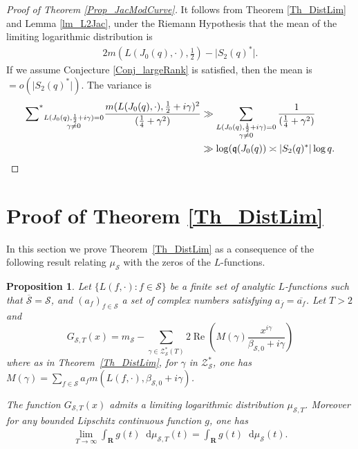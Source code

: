 \documentclass[a4paper,10pt]{amsart}
\theoremstyle{plain}
\newtheorem{prop}[theo]{Proposition}
\theoremstyle{definition}
\begin{document}
\begin{proof}[Proof of Theorem \ref{Prop_JacModCurve}]
It follows from Theorem \ref{Th_DistLim} and Lemma \ref{lm_L2Jac}, under the Riemann Hypothesis that
the mean of the limiting logarithmic distribution is
\begin{align*}
2m\left(L(J_{0}(q),\cdot),\frac{1}{2}\right) - \lvert S_{2}(q)^{*} \rvert.
\end{align*}
If we assume Conjecture \ref{Conj_largeRank} is satisfied, then the mean is $=o(\lvert S_{2}(q)^{*} \rvert)$.
The variance is
\begin{align*}
{\mathop{\sum \Bigl.^{*}}\limits}_{\substack{L(J_{0}(q),\frac{1}{2} +i\gamma)=0 \\ \gamma\neq 0}}\frac{m(L(J_{0}(q),\cdot),\frac{1}{2} +i\gamma)^{2}}{(\frac{1}{4}+\gamma^{2})}
&\gg \sum_{\substack{L(J_{0}(q),\frac{1}{2} +i\gamma)=0 \\ \gamma\neq 0}}\frac{1}{(\frac{1}{4}+\gamma^{2})} \\
&\gg \log(\mathfrak{q}(J_{0}(q)) \asymp \lvert S_{2}(q)^{*} \rvert \log q.
\end{align*}
\end{proof}

\section{Proof of Theorem \ref{Th_DistLim}}\label{Sec_ProofExist}

In this section we prove Theorem~\ref{Th_DistLim} as a consequence of the following result relating $\mu_{\mathcal{S}}$ with the zeros of the $L$-functions.
\begin{prop}\label{Prop_LimOfDist}
Let $\lbrace L(f,\cdot) : f\in\mathcal{S} \rbrace$ be a finite set of analytic $L$-functions such that $\overline{\mathcal{S}}=\mathcal{S}$, 
and $(a_{f})_{f\in \mathcal{S}}$ a set of complex numbers satisfying $a_{\overline{f}}= \overline{a_{f}}$.
Let $T>2$ and 
$$G_{\mathcal{S},T}(x) = m_{\mathcal{S}} -\sum_{\gamma\in\mathcal{Z}_{\mathcal{S}}^{*}(T)}2\operatorname{Re}\left(M(\gamma)\frac{x^{i\gamma}}{\beta_{\mathcal{S},0} + i\gamma}\right)$$
where as in Theorem~\ref{Th_DistLim}, for $\gamma$ in $\mathcal{Z}_{\mathcal{S}}^{*}$, one has
$M(\gamma) = \sum_{f\in\mathcal{S}}a_{f}m(L(f,\cdot),\beta_{\mathcal{S},0}+i\gamma)$.
	
The function $G_{\mathcal{S},T}(x)$ admits a limiting logarithmic distribution $\mu_{\mathcal{S},T}$.
Moreover for any bounded Lipschitz continuous function $g$, one has
\begin{align*}
\lim_{T\rightarrow\infty}\int_{\mathbf{R}}g(t){\mathop{}\!\mathrm{d}}\mu_{\mathcal{S},T}(t) = 
\int_{\mathbf{R}}g(t){\mathop{}\!\mathrm{d}}\mu_{\mathcal{S}}(t).
\end{align*}
\end{prop}
\end{document}
